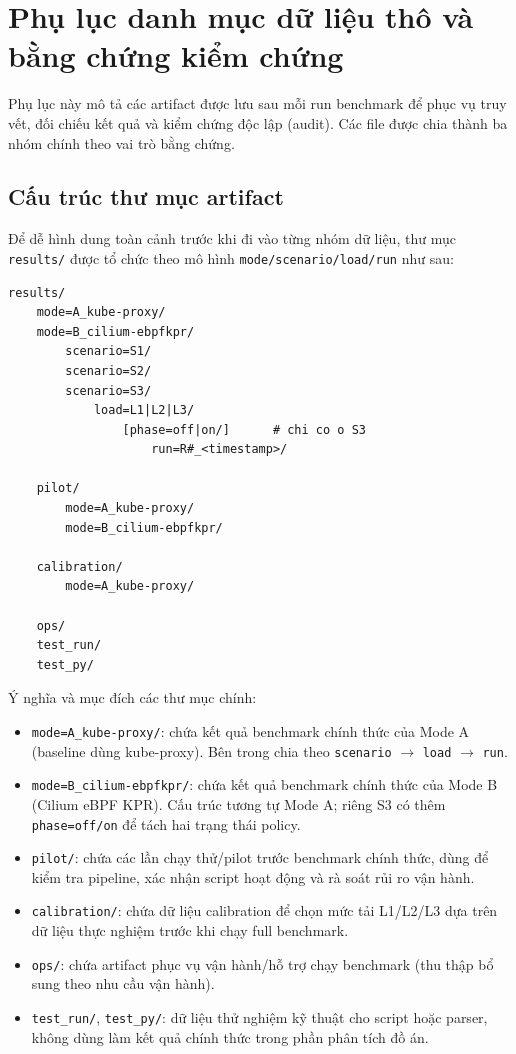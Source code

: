 
\chapter{Phụ lục danh mục dữ liệu thô và bằng chứng kiểm chứng}
\label{app:raw-data}

Phụ lục này mô tả các artifact được lưu sau mỗi run benchmark để phục vụ truy vết, đối chiếu kết quả và kiểm chứng độc lập (audit). Các file được chia thành ba nhóm chính theo vai trò bằng chứng.

\section{Cấu trúc thư mục artifact}

Để dễ hình dung toàn cảnh trước khi đi vào từng nhóm dữ liệu, thư mục \texttt{results/} được tổ chức theo mô hình \texttt{mode/scenario/load/run} như sau:

\begin{lstlisting}
results/
	mode=A_kube-proxy/
	mode=B_cilium-ebpfkpr/
		scenario=S1/
		scenario=S2/
		scenario=S3/
			load=L1|L2|L3/
				[phase=off|on/]      # chi co o S3
					run=R#_<timestamp>/

	pilot/
		mode=A_kube-proxy/
		mode=B_cilium-ebpfkpr/

	calibration/
		mode=A_kube-proxy/

	ops/
	test_run/
	test_py/
\end{lstlisting}

Ý nghĩa và mục đích các thư mục chính:

\begin{itemize}
	\item \texttt{mode=A\_kube-proxy/}: chứa kết quả benchmark chính thức của Mode A (baseline dùng kube-proxy). Bên trong chia theo \texttt{scenario} $\rightarrow$ \texttt{load} $\rightarrow$ \texttt{run}.
	\item \texttt{mode=B\_cilium-ebpfkpr/}: chứa kết quả benchmark chính thức của Mode B (Cilium eBPF KPR). Cấu trúc tương tự Mode A; riêng S3 có thêm \texttt{phase=off/on} để tách hai trạng thái policy.
	\item \texttt{pilot/}: chứa các lần chạy thử/pilot trước benchmark chính thức, dùng để kiểm tra pipeline, xác nhận script hoạt động và rà soát rủi ro vận hành.
	\item \texttt{calibration/}: chứa dữ liệu calibration để chọn mức tải L1/L2/L3 dựa trên dữ liệu thực nghiệm trước khi chạy full benchmark.
	\item \texttt{ops/}: chứa artifact phục vụ vận hành/hỗ trợ chạy benchmark (thu thập bổ sung theo nhu cầu vận hành).
	\item \texttt{test\_run/}, \texttt{test\_py/}: dữ liệu thử nghiệm kỹ thuật cho script hoặc parser, không dùng làm kết quả chính thức trong phần phân tích đồ án.
\end{itemize}

